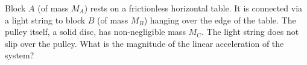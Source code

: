 %
Block $A$ (of mass $M_A$) rests on a frictionless horizontal table.
It is connected via a light string to block $B$ (of mass $M_B$)
hanging over the edge of the table. The pulley itself, a solid disc,
has non-negligible mass $M_C$. The light string does not slip over
the pulley. What is the magnitude of the linear acceleration of the
system?
